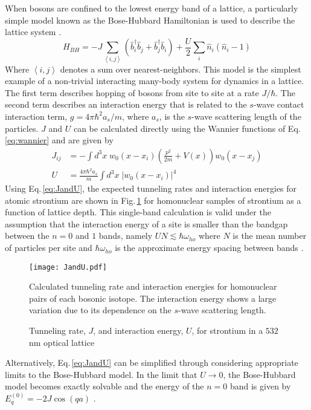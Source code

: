 When bosons are confined to the lowest energy band of a lattice, a particularly simple model known as the Bose-Hubbard Hamiltonian is used to describe the lattice system \cite{jbc98}. 
	\begin{equation} \label{eq:boseHubbard}
		 H_{BH} = -J \sum_{\left< i,j \right>} \left(\hat{b}^{\dagger}_i \hat{b}_j + \hat{b}^{\dagger}_j \hat{b}_i \right)
		 		  + \frac{U}{2} \sum_i \hat{n}_i(\hat{n}_i - 1)
	\end{equation}
Where $\left< i,j \right>$ denotes a sum over nearest-neighbors. This model is the simplest example of a non-trivial interacting many-body system for dynamics in a lattice.
The first term describes hopping of bosons from site to site at a rate $J/ \hbar$. 
The second term describes an interaction energy that is related to the $s$-wave contact interaction term, $g = 4 \pi \hbar^2 a_s/m$, where $a_s$, is the $s$-wave scattering length of the particles. 
$J$ and $U$ can be calculated directly using the Wannier functions of Eq.\;\ref{eq:wannier} and are given by \cite{Jaksch2005}
	\begin{equation} \label{eq:JandU}
	\begin{aligned}
		 J_{ij} &= - \int d^3x \; w_0(x-x_i) \left( \frac{p^2}{2m}+V(x) \right) w_0(x-x_j)\\
		 U &= \frac{4 \pi \hbar^2 a_s}{m} \int d^3x \; \left| w_0(x-x_i)\right|^4
	\end{aligned}
	\end{equation}
Using Eq.\,\ref{eq:JandU}, the expected tunneling rates and interaction energies for atomic strontium are shown in Fig.\,\ref{fig:fig_JandU} for homonuclear samples of strontium as a function of lattice depth. 
This single-band calculation is valid under the assumption that the interaction energy of a site is smaller than the bandgap between the $n= 0$ and $1$ bands, namely $U N \lesssim \hbar \omega_{ho}$ where $N$ is the mean number of particles per site and $\hbar \omega_{ho}$ is the approximate energy spacing between bands \cite{Rey2004}. 
	\begin{figure}
		\centerline{
		\texttt{[image: JandU.pdf]}}
		\caption{Tunneling rate, $J$, and interaction energy, $U$, for strontium in a $532$\,nm optical lattice}{Calculated tunneling rate and interaction energies for homonuclear pairs of each bosonic isotope. The interaction energy shows a large variation due to its dependence on the $s$-wave scattering length.}
		\label{fig:fig_JandU}
	\end{figure}
Alternatively, Eq.\,\ref{eq:JandU} can be simplified through considering appropriate limits to the Bose-Hubbard model. In the limit that $U\!\rightarrow\!0$, the Bose-Hubbard model becomes exactly solvable and the energy of the $n=0$ band is given by $E_q^{(0)}=-2J \cos(q a)$ \cite{Jaksch2005}.

